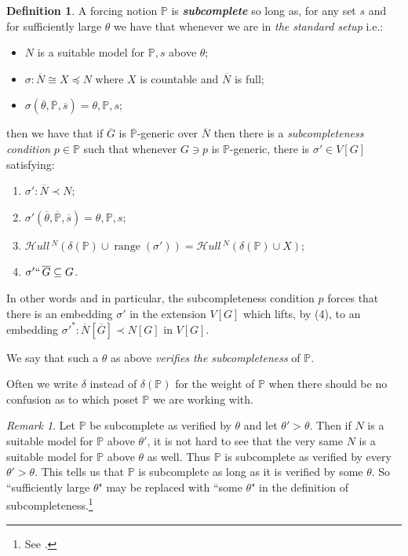 \documentclass{amsart}
\theoremstyle{definition}
\newtheorem{definition}[theorem]{Definition}
\theoremstyle{remark}
\newtheorem{remark}[theorem]{Remark}
\renewcommand{\P}{\mathbb{P}}
\newcommand{\N}{{\overline{N}}}
\newcommand{\G}{\overline{G}}
\DeclareMathOperator{\ran}{range}
\newcommand{\SH}{\mathcal{H}\textit{ull} \,}
\newcommand{\sk}[3]{\SH^{#1}( {#2} \cup {\ran(#3)} ) }
\newcommand{\Sk}[3]{\SH^{#1}( {#2} \cup {#3} ) }
\begin{document}
\begin{definition} \label{definition:SC}
A forcing notion $\P$ is \emph{\textbf{subcomplete}} so long as, for any set $s$ and 
for sufficiently large $\theta$ we have that whenever we are in \emph{the standard setup} i.e.: \begin{itemize}
	\item $N$ is a suitable model for $\P,s$ above $\theta$;
	\item $\sigma: \N \cong X \preccurlyeq N$ where $X$ is countable and $\N$ is full;
	\item $\sigma(\overline \theta, \overline{\P}, \overline s)=\theta, \P, s$;
\end{itemize}
then we have that if $\G$ is  $\overline{\P}$-generic over $\N$ then there is a \emph{subcompleteness condition} $p \in \P$ such that whenever $G \ni p$ is $\P$-generic, there is $\sigma' \in V[G]$ satisfying: \begin{enumerate}
	\item $\sigma': \N \prec N$;
	\item $\sigma'(\overline \theta, \overline{\P}, \overline s)=\theta, \P, s$;
	\item \label{item:skolemcompatibility} $\sk{N}{\delta(\P)}{\sigma'} = \Sk{N}{\delta(\P)}{X}$;
	\item  \label{item:sigmaprimelifts}$\sigma'``\, \G \subseteq G$.
\end{enumerate}
In other words and in particular, the subcompleteness condition $p$ forces that there is an embedding $\sigma'$ in the extension $V[G]$ which lifts, by (4), to an embedding $\sigma'^*:\N[\G] \prec N[G]$ in $V[G]$.

We say that such a $\theta$ as above \textit{verifies the subcompleteness} of $\P$.

Often we write $\delta$ instead of $\delta(\P)$ for the weight of $\P$ when there should be no confusion as to which poset $\P$ we are working with.%
\end{definition}

\begin{remark}\label{remark:VerifyingSC}Let $\P$ be subcomplete as verified by $\theta$ and let $\theta'>\theta$. Then if $N$ is a suitable model for $\P$ above $\theta'$, it is not hard to see that the very same $N$ is a suitable model for $\P$ above $\theta$ as well. Thus $\P$ is subcomplete as verified by every $\theta' > \theta$. This tells us that $\P$ is subcomplete as long as it is verified by some $\theta$. So ``sufficiently large $\theta$" may be replaced with ``some $\theta$" in the definition of subcompleteness.\footnote{See \cite[Section 3.1 Lemma 2.4]{Jensen:2014}.} \end{remark}
\end{document}
